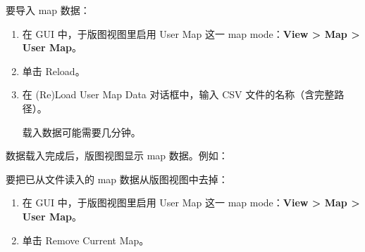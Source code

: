 要导入 map 数据：
\begin{enumerate}
  \item 在 GUI 中，于版图视图里启用 User Map 这一 map mode：\textbf{View > Map > User Map}。
  \item 单击 Reload。
  \item 在 (Re)Load User Map Data 对话框中，输入 CSV 文件的名称（含完整路径）。

  载入数据可能需要几分钟。
\end{enumerate}

数据载入完成后，版图视图显示 map 数据。例如：

要把已从文件读入的 map 数据从版图视图中去掉：
\begin{enumerate}
  \item 在 GUI 中，于版图视图里启用 User Map 这一 map mode：\textbf{View > Map > User Map}。
  \item 单击 Remove Current Map。
\end{enumerate}
